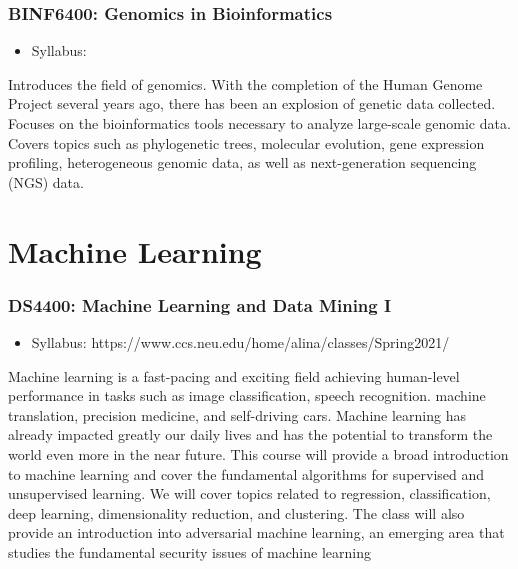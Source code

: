 \documentclass[
  letterpaper,
  DIV=11,
  numbers=noendperiod]{scrreprt}
\providecommand{\tightlist}{%
  \setlength{\itemsep}{0pt}\setlength{\parskip}{0pt}}\usepackage{longtable,booktabs,array}
\begin{document}
\hypertarget{binf6400-genomics-in-bioinformatics}{%
\subsubsection*{\texorpdfstring{\textbf{BINF6400: Genomics in
Bioinformatics}}{BINF6400: Genomics in Bioinformatics}}\label{binf6400-genomics-in-bioinformatics}}

\begin{itemize}
\tightlist
\item
  Syllabus:
\end{itemize}

Introduces the field of genomics. With the completion of the Human
Genome Project several years ago, there has been an explosion of genetic
data collected. Focuses on the bioinformatics tools necessary to analyze
large-scale genomic data. Covers topics such as phylogenetic trees,
molecular evolution, gene expression profiling, heterogeneous genomic
data, as well as next-generation sequencing (NGS) data.

\hypertarget{machine-learning}{%
\section*{\texorpdfstring{\textbf{Machine
Learning}}{Machine Learning}}\label{machine-learning}}

\hypertarget{ds4400-machine-learning-and-data-mining-i}{%
\subsubsection*{\texorpdfstring{\textbf{DS4400: Machine Learning and
Data Mining
I}}{DS4400: Machine Learning and Data Mining I}}\label{ds4400-machine-learning-and-data-mining-i}}

\begin{itemize}
\tightlist
\item
  Syllabus: https://www.ccs.neu.edu/home/alina/classes/Spring2021/
\end{itemize}

Machine learning is a fast-pacing and exciting field achieving
human-level performance in tasks such as image classification, speech
recognition. machine translation, precision medicine, and self-driving
cars. Machine learning has already impacted greatly our daily lives and
has the potential to transform the world even more in the near future.
This course will provide a broad introduction to machine learning and
cover the fundamental algorithms for supervised and unsupervised
learning. We will cover topics related to regression, classification,
deep learning, dimensionality reduction, and clustering. The class will
also provide an introduction into adversarial machine learning, an
emerging area that studies the fundamental security issues of machine
learning
\end{document}
